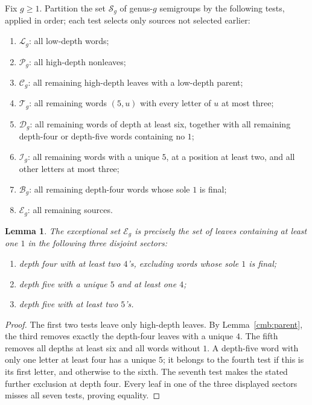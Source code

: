 \documentclass[11pt]{amsart}
\newtheorem{lemma}[theorem]{Lemma}
\theoremstyle{definition}
\theoremstyle{remark}
\numberwithin{equation}{section}
\begin{document}
Fix $g\ge1$. Partition the set $\mathcal S_g$ of genus-$g$ semigroups by
the following tests, applied in order; each test selects only sources not
selected earlier:
\begin{enumerate}
\item $\mathcal L_g$: all low-depth words;
\item $\mathcal P_g$: all high-depth nonleaves;
\item $\mathcal C_g$: all remaining high-depth leaves with a low-depth parent;
\item $\mathcal T_g$: all remaining words $(5,u)$ with every letter of $u$
  at most three;
\item $\mathcal D_g$: all remaining words of depth at least six, together
  with all remaining depth-four or depth-five words containing no $1$;
\item $\mathcal I_g$: all remaining words with a unique $5$, at a position
  at least two, and all other letters at most three;
\item $\mathcal B_g$: all remaining depth-four words whose sole $1$ is final;
\item $\mathcal E_g$: all remaining sources.
\end{enumerate}

\begin{lemma}\label{cmb:residual}
The exceptional set $\mathcal E_g$ is precisely the set of leaves containing
at least one $1$ in the following three disjoint sectors:
\begin{enumerate}
\item depth four with at least two $4$'s, excluding words whose sole $1$ is final;
\item depth five with a unique $5$ and at least one $4$;
\item depth five with at least two $5$'s.
\end{enumerate}
\end{lemma}
\begin{proof}
The first two tests leave only high-depth leaves. By Lemma~\ref{cmb:parent},
the third removes exactly the depth-four leaves with a unique $4$.
The fifth removes all depths at least six and all words without $1$.
A depth-five word with only one letter at least four has a unique $5$;
it belongs to the fourth test if this is its first letter, and otherwise
to the sixth. The seventh test makes the stated further exclusion at depth
four. Every leaf in one of the three displayed sectors misses all seven
tests, proving equality.
\end{proof}
\end{document}
